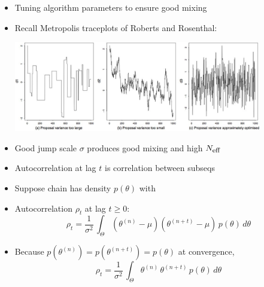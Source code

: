 \documentclass[10pt]{report}
\begin{document}
\begin{itemize}
\item Tuning algorithm parameters to ensure good mixing
\item Recall Metropolis traceplots of Roberts and Rosenthal:
\begin{center}
\includegraphics[width=0.85\textwidth]{img/roberts-rosenthal-traceplots.jpg}
\end{center}
\item Good jump scale $\sigma$ produces good mixing and high
$N_{\mbox{\footnotesize eff}}$
\end{itemize}


%
\begin{itemize}
\item Autocorrelation at lag $t$ is correlation between subseqs
\item  Suppose chain has density $p(\theta)$ with
\item Autocorrelation $\rho_t$ at lag $t \geq 0$:
\[
\rho_t  =  \frac{1}{\sigma^2} \, \int_{\Theta} (\theta^{(n)} - \mu)
       (\theta^{(n+t)} - \mu) \, p(\theta) \, d\theta
\]
\item Because $p(\theta^{(n)}) = p(\theta^{(n+t)}) = p(\theta)$ at convergence,
\[
\rho_t = \frac{1}{\sigma^2} \, \int_{\Theta} \theta^{(n)} \, \theta^{(n+t)} \, p(\theta) \, d\theta
\]
\end{itemize}
\end{document}
